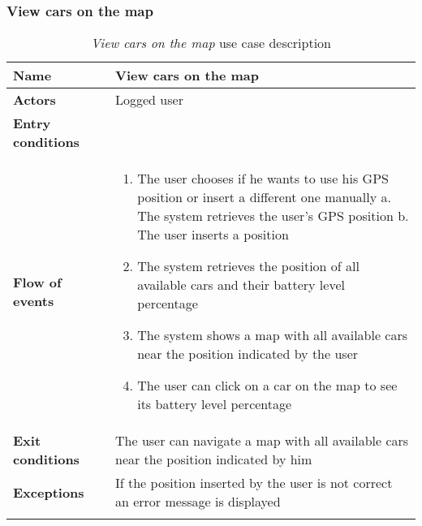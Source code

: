 \clearpage
\subsubsection{View cars on the map}
\begin{longtable}{p{0.25\linewidth}p{0.75\linewidth}}
\toprule
\textbf{Name} & \textbf{View cars on the map} \\
\midrule
\textbf{Actors} &  Logged user \\
\midrule
\textbf{Entry conditions} & \\
\midrule
\textbf{Flow of events} & 
\begin{enumerate}
	\item The user chooses if he wants to use his GPS position or insert a different one manually
		\subitem a. The system retrieves the user's GPS position
		\subitem b. The user inserts a position
	\item The system retrieves the position of all available cars and their battery level percentage
	\item The system shows a map with all available cars near the position indicated by the user
	\item The user can click on a car on the map to see its battery level percentage
\end{enumerate}\\
\midrule
\textbf{Exit conditions} & The user can navigate a map with all available cars near the position indicated by him\\
\midrule
\textbf{Exceptions} & 
If the position inserted by the user is not correct an error message is displayed \\
\bottomrule
\caption{\emph{View cars on the map} use case description}
\end{longtable}

\clearpage
